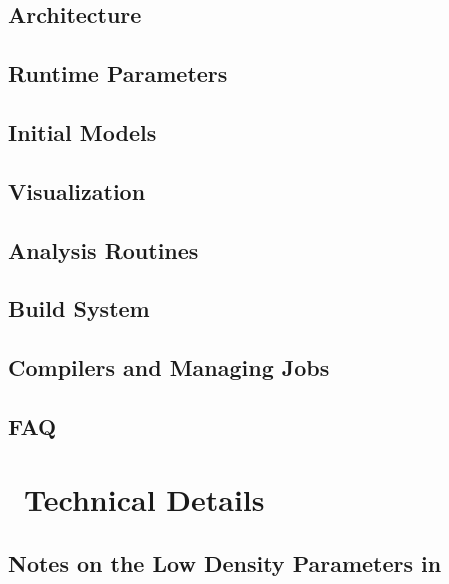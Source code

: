 \documentclass[11pt]{book}    %
\begin{document}
\chapter{Architecture}


\chapter{Runtime Parameters}
\label{ch:runtimeparameters}



\chapter{Initial Models}


\chapter{Visualization}


\chapter{Analysis Routines}


\chapter{Build System}


\chapter{Compilers and Managing Jobs}


\chapter{FAQ}


\part{\maestro\ Technical Details}

\chapter{Notes on the Low Density Parameters in \maestro}

\end{document}
